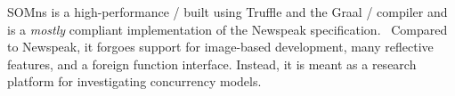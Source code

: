 SOMns \cite{Marr2015_eventloop} is a high-performance \vm/ built using Truffle and the Graal \JITing/ compiler \cite{Wurthinger2013} and is a \emph{mostly} compliant implementation of the Newspeak specification.\footnotemark~ Compared to Newspeak, it forgoes support for image-based development, many reflective features, and a foreign function interface. Instead, it is meant as a research platform for investigating concurrency models.



%












%
